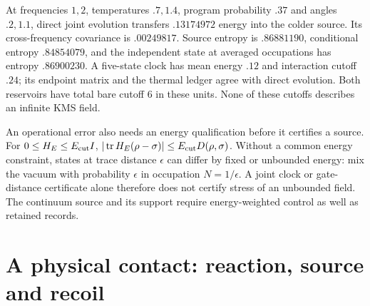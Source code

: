 At frequencies $1,2$, temperatures $.7,1.4$, program probability $.37$
and angles $.2,1.1$, direct joint evolution transfers $.13174972$
energy into the colder source. Its cross-frequency covariance is
$.00249817$. Source entropy is $.86881190$, conditional entropy
$.84854079$, and the independent state at averaged occupations has
entropy $.86900230$. A five-state clock has mean energy $.12$ and
interaction cutoff $.24$; its endpoint matrix and the thermal ledger
agree with direct evolution. Both reservoirs have total bare cutoff
$6$ in these units. None of these cutoffs describes an infinite KMS field.

An operational error also needs an energy qualification before it
certifies a source. For $0\le H_E\le E_{\rm cut}I$,
$|\operatorname{tr}H_E(\rho-\sigma)|\le E_{\rm cut}D(\rho,\sigma)$.
Without a common energy constraint, states at trace distance
$\epsilon$ can differ by fixed or unbounded energy: mix the vacuum
with probability $\epsilon$ in occupation $N=1/\epsilon$.
A joint clock or gate-distance certificate alone therefore does not
certify stress of an unbounded field. The continuum source and its
support require energy-weighted control as well as retained records.

\section{A physical contact: reaction, source and recoil}
\label{sec:inertial-contact}

